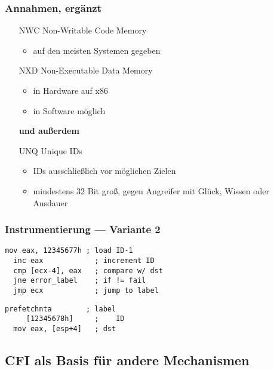 \documentclass[mathserif,slidestop,compress,red]{beamer}
\begin{document}
\begin{frame}
  \frametitle{Annahmen, ergänzt}
  \begin{itemize}
    \item[NWC] Non-Writable Code Memory
    \begin{itemize}
      \item auf den meisten Systemen gegeben
    \end{itemize}
    \item[NXD] Non-Executable Data Memory
    \begin{itemize}
      \item in Hardware auf x86
      \item in Software möglich
    \end{itemize}
    \begin{flushleft}
      \textbf{und außerdem}
    \end{flushleft}
    \item[UNQ] Unique IDs
    \begin{itemize}
      \item IDs ausschließlich vor möglichen Zielen
      \item mindestens 32 Bit groß, gegen Angreifer mit Glück, Wissen oder Ausdauer
    \end{itemize}
  \end{itemize}
\end{frame}

\begin{frame}[fragile]
  \frametitle{Instrumentierung — Variante 2}
  \begin{lstlisting}[title=Quelle]
  mov eax, 12345677h ; load ID-1
  inc eax            ; increment ID
  cmp [ecx-4], eax   ; compare w/ dst
  jne error_label    ; if != fail
  jmp ecx            ; jump to label
  \end{lstlisting}
  \begin{lstlisting}[title=Ziel]
  prefetchnta        ; label
     [12345678h]     ;    ID
  mov eax, [esp+4]   ; dst
  \end{lstlisting}
\end{frame}

\subsection{CFI als Basis für andere Mechanismen}
\end{document}
